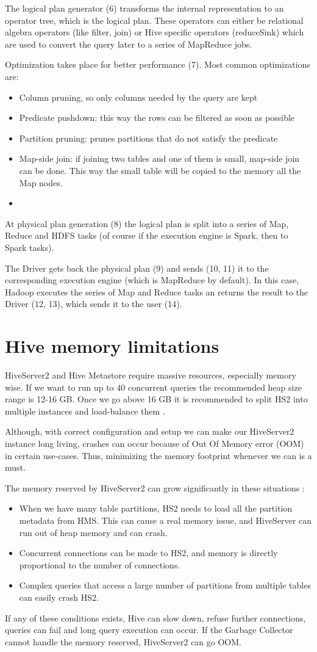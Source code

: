 The logical plan generator (6) transforms the internal representation to an operator tree, which is the logical plan. These operators can either be relational algebra operators (like filter, join) or Hive specific operators (\eg reduceSink) which are used to convert the query later to a series of MapReduce jobs.

Optimization takes place for better performance (7). Most common optimizations are: 
\begin{itemize}
	\item Column pruning, so only columns needed by the query are kept
	\item Predicate pushdown: this way the rows can be filtered as soon as possible
	\item Partition pruning: prunes partitions that do not satisfy the predicate
	\item Map-side join: if joining two tables and one of them is small, map-side join can be done. This way the small table will be copied to the memory all the Map nodes.
	\item \etc
\end{itemize}

At physical plan generation (8) the logical plan is split into a series of Map, Reduce and HDFS tasks (of course if the execution engine is Spark, then to Spark tasks). 

The Driver gets back the physical plan (9) and sends (10, 11) it to the corresponding execution engine (which is MapReduce by default). In this case, Hadoop executes the series of Map and Reduce tasks an returns the result to the Driver (12, 13), which sends it to the user (14).

\section{Hive memory limitations}
HiveServer2 and Hive Metastore require massive resources, especially memory wise. If we want to run up to 40 concurrent queries the recommended heap size range is 12-16 GB. Once we go above 16 GB it is recommended to split HS2 into multiple instances and load-balance them \cite{Hive-memory-problems}.

Although, with correct configuration and setup we can make our HiveServer2 instance long living, crashes can occur because of Out Of Memory error (OOM) in certain use-cases. Thus, minimizing the memory footprint whenever we can is a must.

\noindent The memory reserved by HiveServer2 can grow significantly in these situations  \cite{Hive-memory-problems}: 
\begin{itemize}
	\item When we have many table partitions, HS2 needs to load all the partition metadata from HMS. This can cause a real memory issue, and  HiveServer can run out of heap memory and can crash.
	\item Concurrent connections can be made to HS2, and memory is directly proportional to the number of connections. 
	\item Complex queries that access a large number of partitions from multiple tables can easily crash HS2.
\end{itemize}

If any of these conditions exists, Hive can slow down, refuse further connections, queries can fail and long query execution can occur. If the Garbage Collector cannot handle the memory reserved, HiveServer2 can go OOM.
